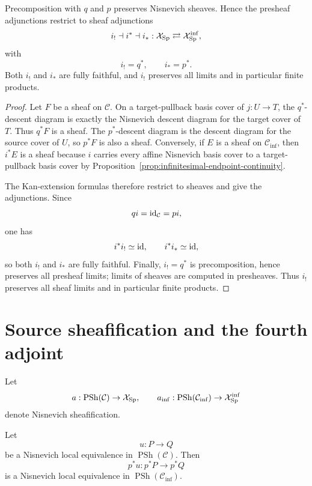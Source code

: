 \begin{proposition}
\label{prop:infinitesimal-first-three-adjoints}
Precomposition with $q$ and $p$ preserves Nisnevich sheaves.  Hence the
presheaf adjunctions restrict to sheaf adjunctions
\[
    i_!\dashv i^*\dashv i_*:
    \mathcal X_{\mathrm{Sp}}
    \rightleftarrows
    \mathcal X_{\mathrm{Sp}}^{\mathrm{inf}},
\]
with
\[
    i_!=q^*,
    \qquad
    i_*=p^*.
\]
Both $i_!$ and $i_*$ are fully faithful, and $i_!$ preserves all limits and
in particular finite products.
\end{proposition}

\begin{proof}
Let $F$ be a sheaf on $\mathcal C$.  On a target-pullback basis cover of
$j:U\to T$, the $q^*$-descent diagram is exactly the Nisnevich descent diagram
for the target cover of $T$.  Thus $q^*F$ is a sheaf.  The $p^*$-descent
diagram is the descent diagram for the source cover of $U$, so $p^*F$ is also
a sheaf.  Conversely, if $E$ is a sheaf on $\mathcal C_{\mathrm{inf}}$, then
$i^*E$ is a sheaf because $i$ carries every affine Nisnevich basis cover to a
target-pullback basis cover by
Proposition~\ref{prop:infinitesimal-endpoint-continuity}.

The Kan-extension formulas therefore restrict to sheaves and give the
adjunctions.  Since
\[
    qi=\operatorname{id}_{\mathcal C}=pi,
\]
one has
\[
    i^*i_!\simeq\operatorname{id},
    \qquad
    i^*i_*\simeq\operatorname{id},
\]
so both $i_!$ and $i_*$ are fully faithful.  Finally, $i_!=q^*$ is
precomposition, hence preserves all presheaf limits; limits of sheaves are
computed in presheaves.  Thus $i_!$ preserves all sheaf limits and in
particular finite products.
\end{proof}

\section{Source sheafification and the fourth adjoint}
\label{sec:infinitesimal-fourth-adjoint}

Let
\[
    a:\operatorname{PSh}(\mathcal C)\to\mathcal X_{\mathrm{Sp}},
    \qquad
    a_{\mathrm{inf}}:
    \operatorname{PSh}(\mathcal C_{\mathrm{inf}})
    \to\mathcal X_{\mathrm{Sp}}^{\mathrm{inf}}
\]
denote Nisnevich sheafification.

\begin{lemma}
\label{lem:infinitesimal-source-local-equivalences}
Let
\[
    u:P\longrightarrow Q
\]
be a Nisnevich local equivalence in $\operatorname{PSh}(\mathcal C)$.  Then
\[
    p^*u:p^*P\longrightarrow p^*Q
\]
is a Nisnevich local equivalence in
$\operatorname{PSh}(\mathcal C_{\mathrm{inf}})$.
\end{lemma}

